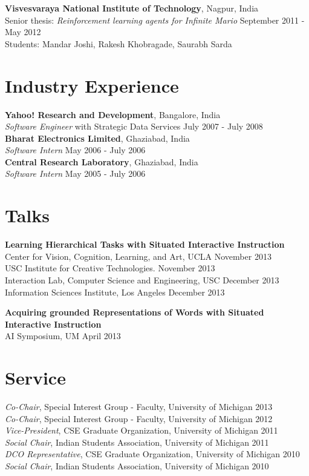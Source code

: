 \documentclass[margin,line,11pt]{res}
\begin{document}
\begin{resume}
\textbf{Visvesvaraya National Institute of Technology}, Nagpur, India\\
Senior thesis: \emph{Reinforcement learning agents for Infinite Mario} \hfill September 2011 - May 2012\\
Students: Mandar Joshi, Rakesh Khobragade, Saurabh Sarda\\

\section{\sc Industry Experience}
{\bf Yahoo! Research and Development}, Bangalore, India \\
\emph{Software Engineer} with Strategic Data Services \hfill July 2007 - July 2008\\
{\bf Bharat Electronics Limited}, Ghaziabad, India \\
\emph{Software Intern} \hfill May 2006 - July 2006\\
{\bf Central Research Laboratory}, Ghaziabad, India \\
\emph{Software Intern} \hfill May 2005 - July 2006 

\section{\sc Talks}
\textbf{Learning Hierarchical Tasks with Situated Interactive Instruction}\\
Center for Vision, Cognition, Learning, and Art, UCLA \hfill November 2013\\
USC Institute for Creative Technologies. \hfill November 2013\\
Interaction Lab, Computer Science and Engineering, USC \hfill December 2013\\
Information Sciences Institute, Los Angeles \hfill December 2013

\textbf{Acquiring grounded Representations of Words with Situated
  Interactive Instruction}\\
AI Symposium, UM \hfill April 2013

\section{\sc Service}
\emph{Co-Chair}, Special Interest Group - Faculty, University of Michigan \hfill 2013 \\
\emph{Co-Chair}, Special Interest Group - Faculty, University of Michigan \hfill 2012 \\
\emph{Vice-President}, CSE Graduate Organization, University of Michigan \hfill 2011 \\
\emph{Social Chair}, Indian Students Association, University of Michigan \hfill 2011\\
\emph{DCO Representative}, CSE Graduate Organization, University of Michigan \hfill 2010 \\
\emph{Social Chair}, Indian Students Association, University of
Michigan \hfill 2010


\end{resume}
\end{document}
